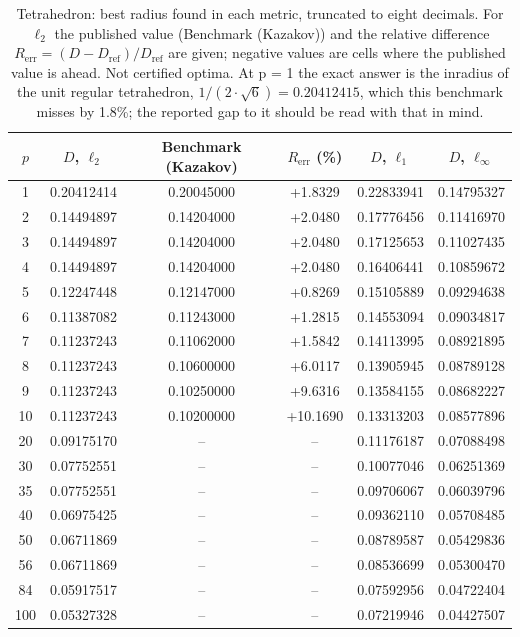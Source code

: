 \begin{table}[t]
  \centering
  \caption{Tetrahedron: best radius found in each metric, truncated to eight decimals. For $\ell_2$ the published value (Benchmark (Kazakov)) and the relative difference $R_{\text{err}} = (D - D_{\mathrm{ref}})/D_{\mathrm{ref}}$ are given; negative values are cells where the published value is ahead. Not certified optima. At p = 1 the exact answer is the inradius of the unit regular tetrahedron, $1/(2 \cdot \sqrt{6}) = 0.20412415$, which this benchmark misses by 1.8\%; the reported gap to it should be read with that in mind.}
  \label{tab:tetrahedron}
  \begin{tabular}{cccccc}
    \hline
    $p$ & $D$, $\ell_2$ & Benchmark (Kazakov) & $R_{\text{err}}$ (\%) & $D$, $\ell_1$ & $D$, $\ell_\infty$ \\
    \hline
    1 & 0.20412414 & 0.20045000 & +1.8329 & 0.22833941 & 0.14795327 \\
    2 & 0.14494897 & 0.14204000 & +2.0480 & 0.17776456 & 0.11416970 \\
    3 & 0.14494897 & 0.14204000 & +2.0480 & 0.17125653 & 0.11027435 \\
    4 & 0.14494897 & 0.14204000 & +2.0480 & 0.16406441 & 0.10859672 \\
    5 & 0.12247448 & 0.12147000 & +0.8269 & 0.15105889 & 0.09294638 \\
    6 & 0.11387082 & 0.11243000 & +1.2815 & 0.14553094 & 0.09034817 \\
    7 & 0.11237243 & 0.11062000 & +1.5842 & 0.14113995 & 0.08921895 \\
    8 & 0.11237243 & 0.10600000 & +6.0117 & 0.13905945 & 0.08789128 \\
    9 & 0.11237243 & 0.10250000 & +9.6316 & 0.13584155 & 0.08682227 \\
    10 & 0.11237243 & 0.10200000 & +10.1690 & 0.13313203 & 0.08577896 \\
    20 & 0.09175170 & -- & -- & 0.11176187 & 0.07088498 \\
    30 & 0.07752551 & -- & -- & 0.10077046 & 0.06251369 \\
    35 & 0.07752551 & -- & -- & 0.09706067 & 0.06039796 \\
    40 & 0.06975425 & -- & -- & 0.09362110 & 0.05708485 \\
    50 & 0.06711869 & -- & -- & 0.08789587 & 0.05429836 \\
    56 & 0.06711869 & -- & -- & 0.08536699 & 0.05300470 \\
    84 & 0.05917517 & -- & -- & 0.07592956 & 0.04722404 \\
    100 & 0.05327328 & -- & -- & 0.07219946 & 0.04427507 \\
    \hline
  \end{tabular}
\end{table}
